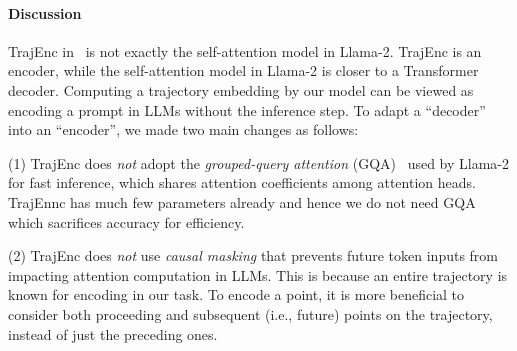 \paragraph{Discussion} 
TrajEnc in \model\ is not exactly the self-attention model in Llama-2. 
TrajEnc is an encoder, while the self-attention model in Llama-2 is closer to a Transformer decoder. 
Computing a trajectory embedding by our model can be viewed as encoding a prompt in LLMs without the inference step. To adapt a ``decoder'' into an ``encoder'', we made two main changes as follows:

(1) TrajEnc does \emph{not} adopt the \emph{grouped-query attention} (GQA)~\cite{gqa} used by Llama-2 for fast inference, which shares attention coefficients among attention heads.
TrajEnnc has much few parameters already and hence we do not need GQA which sacrifices accuracy for efficiency.

(2) TrajEnc does \emph{not} use \emph{causal masking} that prevents future token inputs from impacting attention computation in LLMs. 
This is because an entire trajectory is known for encoding in our task. To encode a  point, 
it is more beneficial to consider both proceeding and subsequent (i.e., future) points on the trajectory, instead of just the preceding ones.

